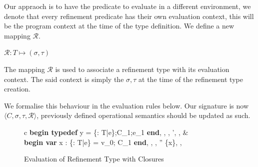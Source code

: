 \documentclass[a4paper,12pt]{report}
\begin{document}
\par
Our appraoch is to have the predicate to evaluate in a different environment, we 
denote that every refinement predicate has their own evaluation context, this 
will be the program context at the time of the type definition. We define a new 
mapping $\mathcal{R}$.

\begin{center}
  $\mathcal{R}: T \mapsto (\sigma, \tau)$   
\end{center}

The mapping $\mathcal{R}$ is used to associate a refinement type with its 
evaluation context. The said context is simply the $\sigma, \tau$ at the time of 
the refinement type creation.

\par
We formalise this behaviour in the evaluation rules below. Our signature is now 
$\langle C, \sigma, \tau, \mathcal{R} \rangle$, previously defined operational 
semantics should be updated as such. 

\begin{figure}[H]
  \begin{center}
    \begin{tabular} {c}
      {\langle\textbf{begin typedef } y = \{\upsilon : T\text{ }|\text{ }e\};C_1;e_1\textbf{ end}, 
      \sigma, \tau,  \rangle \longrightarrow \langle \sigma', \tau,  \rangle} 
      & \\
      {\langle\textbf{begin var }x : \{\upsilon : T\text{ }|\text{ }e\} = v_0; C_1 \textbf{ end}, \sigma, \tau,  \rangle 
      \longrightarrow \langle \sigma'' \setminus \{x\}, \tau,  \rangle}
    \end{tabular}
  \end{center}
  \caption{Evaluation of Refinement Type with Closures}
\end{figure}
\end{document}

